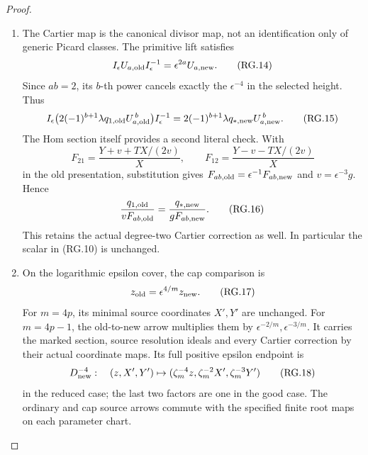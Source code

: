 \begin{proof}
\begin{enumerate}[label=\arabic*.]
\item The Cartier map is the canonical divisor map, not an identification
only of generic Picard classes. The primitive lift satisfies
\[
 I_\epsilon U_{a,\rm old}I_\epsilon^{-1}
                  =\epsilon^{2a}U_{a,\rm new}.
                                                        \tag{RG.14}
\]
Since \(ab=2\), its \(b\)-th power cancels exactly the
\(\epsilon^{-4}\) in the selected height. Thus
\[
 I_\epsilon\bigl(2(-1)^{b+1}\lambda
             q_{1,\rm old}U_{a,\rm old}^{\,b}\bigr)
 I_\epsilon^{-1}
       =2(-1)^{b+1}\lambda q_{*,\rm new}U_{a,\rm new}^{\,b}.
                                                        \tag{RG.15}
\]
The Hom section itself provides a second literal check. With
\[
 F_{21}=\frac{Y+v+TX/(2v)}X,\qquad
 F_{12}=\frac{Y-v-TX/(2v)}X
\]
in the old presentation, substitution gives
\(F_{ab,\rm old}=\epsilon^{-1}F_{ab,\rm new}\) and
\(v=\epsilon^{-3}g\). Hence
\[
       \frac{q_{1,\rm old}}{vF_{ab,\rm old}}
               =\frac{q_{*,\rm new}}{gF_{ab,\rm new}}. \tag{RG.16}
\]
This retains the actual degree-two Cartier correction as well.
In particular the scalar in (RG.10) is unchanged.

\item On the logarithmic epsilon cover, the cap comparison is
\[
 z_{\rm old}=\epsilon^{4/m}z_{\rm new}.
                                                        \tag{RG.17}
\]
For \(m=4p\), its minimal source coordinates \(X',Y'\) are
unchanged. For \(m=4p-1\), the old-to-new arrow multiplies
them by \(\epsilon^{-2/m},\epsilon^{-3/m}\). It carries the
marked section, source resolution ideals and every Cartier
correction by their actual coordinate maps. Its full positive
epsilon endpoint is
\[
 D_{\rm new}^{-4}:\quad
 (z,X',Y')\mapsto
 (\zeta_m^{-4}z,\zeta_m^{-2}X',\zeta_m^{-3}Y')
                                                        \tag{RG.18}
\]
in the reduced case; the last two factors are one in the good
case. The ordinary and cap source arrows commute with the
specified finite root maps on each parameter chart.


\end{enumerate}
\end{proof}
